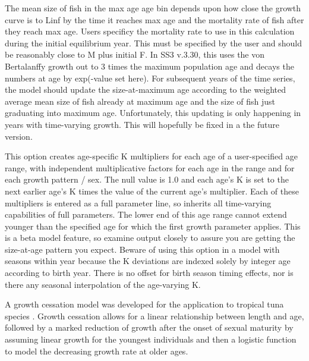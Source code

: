 The mean size of fish in the max age age bin depends upon how close the growth curve is to Linf by the time it reaches max age and the mortality rate of fish after they reach max age. Users specificy the mortality rate to use in this calculation during the initial equilibrium year. This must be specified by the user and should be reasonably close to M plus initial F. In SS3 v.3.30, this uses the von Bertalanffy growth out to 3 times the maximum population age and decays the numbers at age by exp(-value set here). For subsequent years of the time series, the model should update the size-at-maximum age according to the weighted average mean size of fish already at maximum age and the size of fish just graduating into maximum age.  Unfortunately, this updating is only happening in years with time-varying growth. This will hopefully be fixed in a the future version.
	
This option creates age-specific K multipliers for each age of a user-specified age range, with independent multiplicative factors for each age in the range and for each growth pattern / sex. The null value is 1.0 and each age's K is set to the next earlier age's K times the value of the current age's multiplier. Each of these multipliers is entered as a full parameter line, so inherits all time-varying capabilities of full parameters. The lower end of this age range cannot extend younger than the specified age for which the first growth parameter applies. This is a beta model feature, so examine output closely to assure you are getting the size-at-age pattern you expect.  Beware of using this option in a model with seasons within year because the K deviations are indexed solely by integer age according to birth year.  There is no offset for birth season timing effects, nor is there any seasonal interpolation of the age-varying K.

\hypertarget{GrowthCessation}{}
A growth cessation model was developed for the application to tropical tuna species \citep{maunder-growth-2018}. Growth cessation allows for a linear relationship between length and age, followed by a marked reduction of growth after the onset of sexual maturity by assuming linear growth for the youngest individuals and then a logistic function to model the decreasing growth rate at older ages.

